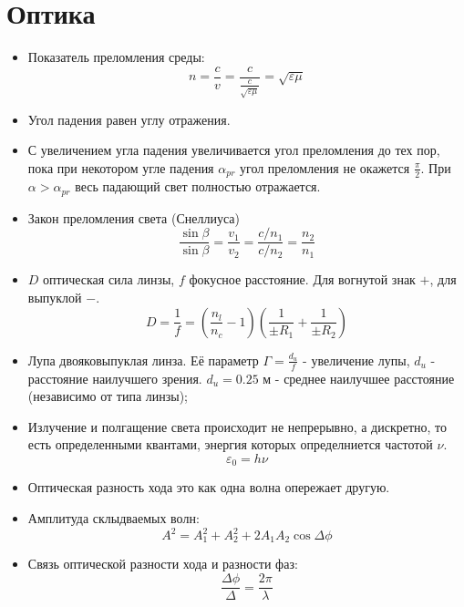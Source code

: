 \documentclass[twoside, a4paperpt, fleqn]{extarticle}
\begin{document}
    \section{Оптика}
    \begin{multicols}{2}
        \begin{itemize}
            \item     Показатель преломления среды:
            \begin{equation*}
                n = \frac{c}{v} = \frac{c}{\frac{c}{\sqrt{\varepsilon \mu}}} = \sqrt{\varepsilon \mu}
            \end{equation*}
            \item Угол падения равен углу отражения.
            \item С увеличением угла падения увеличивается угол преломления до тех пор, пока при некотором угле падения $\alpha_{pr}$ угол преломления не окажется $\frac{\pi}{2}$. При $\alpha > \alpha_{pr}$ весь падающий свет полностью отражается.
            \item Закон преломления света (Снеллиуса)
            \begin{equation*}
                \frac{\sin \beta}{\sin \beta} = \frac{v_1}{v_2} =  \frac{c / n_1}{c / n_2} = \frac{n_2}{n_1}
            \end{equation*}
            \item $D$ оптическая сила линзы, $f$ фокусное расстояние. 
            Для вогнутой знак $+$, для выпуклой $-$.
            \begin{equation*}
                D = \frac{1}{f} = \left( \frac{n_l}{n_c} - 1 \right)\left( \frac{1}{\pm R_1} + \frac{1}{\pm R_2}  \right)
            \end{equation*}
            \item Лупа двояковыпуклая линза. Её параметр $\Gamma = \frac{d_u}{f}$ - увеличение лупы, $d_u$ - расстояние наилучшего зрения. $d_u = 0.25$ м - среднее наилучшее расстояние (независимо от типа линзы);
            \item Излучение и полгащение света происходит не непрерывно, а дискретно, то есть определенными квантами, энергия которых определниется частотой $\nu$.
            \begin{equation*}
                \varepsilon_0 = h \nu
            \end{equation*}
            \item Оптическая разность хода это как одна волна опережает другую.
            \item Амплитуда склыдваемых волн:
            \begin{equation*}
                A^2 = A_1^2 + A_2^2 + 2 A_1 A_2 \cos \Delta \phi
            \end{equation*}
            \item Связь оптической разности хода и разности фаз:
            \begin{equation*}
                \frac{\Delta \phi}{\Delta} = \frac{2 \pi}{\lambda}
            \end{equation*}
    

\end{itemize}
\end{multicols}
\end{document}
